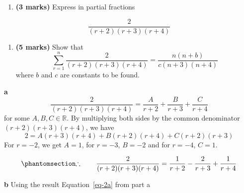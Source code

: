 \documentclass[
  a4paper,
]{report}
\providecommand{\tightlist}{%
  \setlength{\itemsep}{0pt}\setlength{\parskip}{0pt}}\usepackage{longtable,booktabs,array}
\begin{document}
\begin{enumerate}
\def\labelenumi{\alph{enumi}.}
\tightlist
\item
  \textbf{(3 marks)} Express in partial fractions
\end{enumerate}

\[\frac{2}{(r+2)(r+3)(r+4)}\]

\begin{enumerate}
\def\labelenumi{\alph{enumi}.}
\setcounter{enumi}{1}
\tightlist
\item
  \textbf{(5 marks)} Show that
  \[\sum_{r=1}^{n}{\frac{2}{(r+2)(r+3)(r+4)}=\frac{n(n+b)}{c(n+3)(n+4)}}\]
  where \(b\) and \(c\) are constants to be found.
\end{enumerate}

\begin{tcolorbox}[enhanced jigsaw, title={Solution}, titlerule=0mm, colbacktitle=quarto-callout-tip-color!10!white, coltitle=black, toprule=.15mm, colframe=quarto-callout-tip-color-frame, breakable, bottomtitle=1mm, toptitle=1mm, arc=.35mm, rightrule=.15mm, bottomrule=.15mm, left=2mm, opacitybacktitle=0.6, leftrule=.75mm, opacityback=0, colback=white]

\textbf{a}
\[\frac{2}{(r+2)(r+3)(r+4)} = \frac{A}{r+2}+\frac{B}{r+3}+\frac{C}{r+4}\]
for some \(A, B, C \in \mathbb{R}\). By multiplying both sides by the
common denominator \((r+2)(r+3)(r+4)\), we have
\[2=A(r+3)(r+4)+B(r+2)(r+4)+C(r+2)(r+3)\] For \(r=-2\), we get \(A=1\),
for \(r=-3\), \(B=-2\) and for \(r=-4\), \(C=1\).

\begin{equation}\phantomsection\label{eq-2a}{\therefore \qquad \frac{2}{(r+2)(r+3)(r+4)} = \frac{1}{r+2}-\frac{2}{r+3}+\frac{1}{r+4} }\end{equation}

\textbf{b} Using the result Equation~\ref{eq-2a} from part a


\end{tcolorbox}
\end{document}
